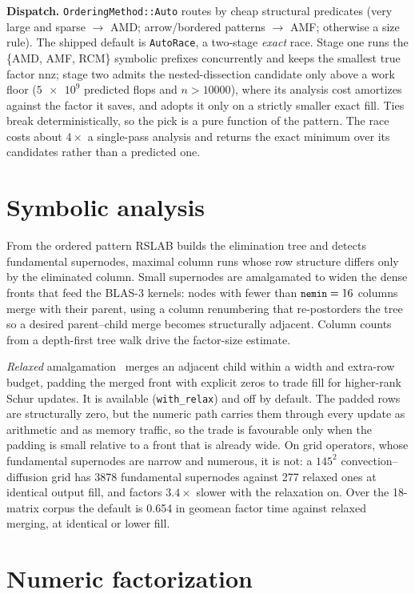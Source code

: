 \documentclass[11pt,a4paper]{article}
\newcommand{\rT}{\textsf{RSLAB}}
\newcommand{\code}[1]{\texttt{\small #1}}
\newcommand{\nnz}{\mathrm{nnz}}
\begin{document}
\textbf{Dispatch.} \code{OrderingMethod::Auto} routes by cheap structural predicates
(very large and sparse $\to$ AMD; arrow/bordered patterns $\to$ AMF; otherwise a size
rule). The shipped default is \code{AutoRace}, a two-stage \emph{exact} race. Stage one
runs the \{AMD, AMF, RCM\} symbolic prefixes concurrently and keeps the smallest true
factor $\nnz$; stage two admits the nested-dissection candidate only above a work floor
($\num{5e9}$ predicted flops and $n>\num{10000}$), where its analysis cost amortizes
against the factor it saves, and adopts it only on a strictly smaller exact fill. Ties
break deterministically, so the pick is a pure function of the pattern. The race costs
about $4\times$ a single-pass analysis and returns the exact minimum over its candidates
rather than a predicted one.

\section{Symbolic analysis}
\label{sec:symbolic}
From the ordered pattern \rT{} builds the elimination tree and detects fundamental
supernodes, maximal column runs whose row structure differs only by the eliminated
column. Small supernodes are amalgamated to widen the dense fronts that feed the BLAS-3
kernels: nodes with fewer than $\code{nemin}=16$ columns~\cite{ssids} merge with their
parent, using a column renumbering that re-postorders the tree so a desired parent--child
merge becomes structurally adjacent. Column counts from a depth-first tree walk drive the
factor-size estimate.

\emph{Relaxed} amalgamation~\cite{ashcraft} merges an adjacent child within a width
and extra-row budget, padding the merged front with explicit zeros to trade fill for
higher-rank Schur updates. It is available (\code{with\_relax}) and off by default. The
padded rows are structurally zero, but the numeric path carries them through every update
as arithmetic and as memory traffic, so the trade is favourable only when the padding is
small relative to a front that is already wide. On grid operators, whose fundamental
supernodes are narrow and numerous, it is not: a $145^2$ convection--diffusion grid has
\num{3878} fundamental supernodes against 277 relaxed ones at identical output fill, and
factors $3.4\times$ slower with the relaxation on. Over the 18-matrix corpus the default
is \num{0.654} in geomean factor time against relaxed merging, at identical or lower
fill.

\section{Numeric factorization}
\label{sec:numeric}
\end{document}
